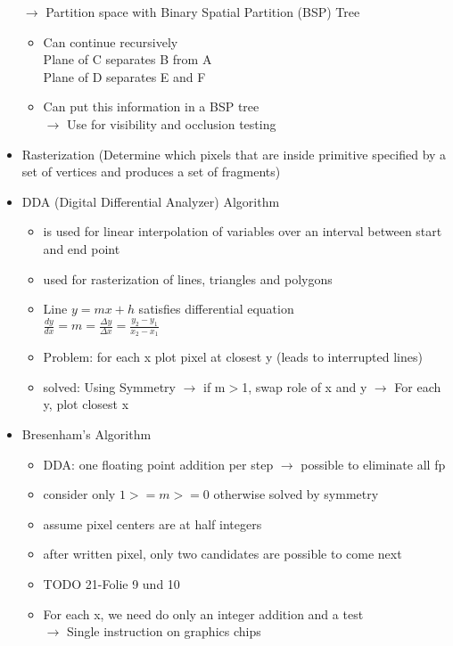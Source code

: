\documentclass[11pt,a4paper]{article}
\begin{document}
\begin{itemize}
			\item[$\rightarrow$] Partition space with Binary Spatial Partition (BSP) Tree
				\begin{itemize}
					\item Can continue recursively\\
					Plane of C separates B from A\\
					Plane of D separates E and F
					\item Can put this information in a BSP tree\\
					$\rightarrow$ Use for visibility and occlusion testing
				\end{itemize}
			\item Rasterization (Determine which pixels that are inside primitive specified by a set of vertices and produces a set of fragments)
			\item DDA (Digital Differential Analyzer) Algorithm
				\begin{itemize}
					\item is used for linear interpolation of variables over an interval between start and end point
					\item used for rasterization of lines, triangles and polygons
					\item Line $y=mx+h$ satisfies differential equation\\
					$\frac{dy}{dx}=m=\frac{\Delta y}{\Delta x}=\frac{y_2-y_1}{x_2-x_1}$
					\item Problem: for each x plot pixel at closest y (leads to interrupted lines)
					\item solved: Using Symmetry $\rightarrow$ if m$>$1, swap role of x and y $\rightarrow$ For each y, plot closest x
				\end{itemize}
			\item Bresenham’s Algorithm
				\begin{itemize}
					\item DDA: one floating point addition per step $\rightarrow$ possible to eliminate all fp
					\item consider only $1>=m>=0$ otherwise solved by symmetry
					\item assume pixel centers are at half integers
					\item after written pixel, only two candidates are possible to come next
					\item TODO 21-Folie 9 und 10
					\item For each x, we need do only an integer addition and a test\\
					$\rightarrow$ Single instruction on graphics chips
				\end{itemize}
		\end{itemize}
\end{document}

